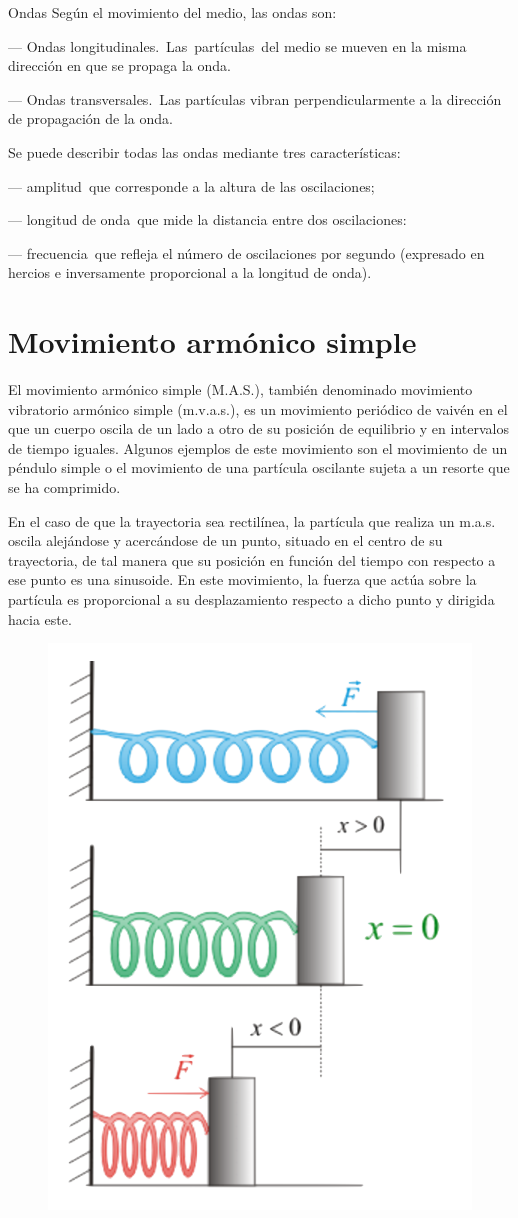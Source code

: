 \begin{myalertblock}{Ondas}
Según el movimiento del medio, las ondas son:

--- Ondas longitudinales. Las partículas del medio se mueven en la misma dirección en que se propaga la onda.

--- Ondas transversales. Las partículas vibran perpendicularmente a la dirección de propagación de la onda.


\vspace{2mm} Se puede describir todas las ondas mediante tres características:

--- amplitud que corresponde a la altura de las oscilaciones;

--- longitud de onda que mide la distancia entre dos oscilaciones:

--- frecuencia que refleja el número de oscilaciones por segundo (expresado en hercios e inversamente proporcional a la longitud de onda).
\end{myalertblock}

\chapter{Movimiento armónico simple}

\vspace{-5mm} %
\begin{miparrafo}
El movimiento armónico simple (M.A.S.), también denominado movimiento vibratorio armónico simple (m.v.a.s.), es un movimiento periódico de vaivén en el que un cuerpo oscila de un lado a otro de su posición de equilibrio y en intervalos de tiempo iguales. Algunos ejemplos de este movimiento son el movimiento de un péndulo simple o el movimiento de una partícula oscilante sujeta a un resorte que se ha comprimido.

\begin{multicols}{2}
En el caso de que la trayectoria sea rectilínea, la partícula que realiza un m.a.s. oscila alejándose y acercándose de un punto, situado en el centro de su trayectoria, de tal manera que su posición en función del tiempo con respecto a ese punto es una sinusoide. En este movimiento, la fuerza que actúa sobre la partícula es proporcional a su desplazamiento respecto a dicho punto y dirigida hacia este.	
\begin{figure}[H]
		\centering
		\includegraphics[width=.25\textwidth]{imagenes/imagenes19/T19IM02.png}
	\end{figure}
\end{multicols}
\end{miparrafo}


